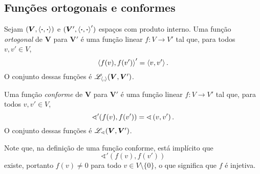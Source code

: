 \subsection{Funções ortogonais e conformes}

\begin{definition}
Sejam $(\bm V,\left\langle{\bm{\cdot}},{\bm{\cdot}}\right\rangle)$ e $(\bm V',\left\langle{\bm{\cdot}},{\bm{\cdot}}\right\rangle')$ espaços com produto interno. Uma função \emph{ortogonal} de $\bm V$ para $\bm V'$ é uma função linear $f\colon V \to V'$ tal que, para todos $v,v' \in V$,
	\begin{equation*}
	\left\langle{f(v)},{f(v')}\right\rangle' = \left\langle{v},{v'}\right\rangle.
	\end{equation*}
O conjunto dessas funções é $\mathscr{L}_{\left\langle{},{}\right\rangle}(\bm V,\bm V')$.

Uma função \emph{conforme} de $\bm V$ para $\bm V'$ é uma função linear $f\colon V \to V'$ tal que, para todos $v,v' \in V$,
	\begin{equation*}
	\sphericalangle'(f(v),f(v')) = \sphericalangle\left({v},{v'}\right).
	\end{equation*}
O conjunto dessas funções é $\mathscr{L}_{\sphericalangle}(\bm V,\bm V')$.
\end{definition}

Note que, na definição de uma função conforme, está implícito que
	\begin{equation*}
	\sphericalangle'(f(v),f(v'))
	\end{equation*}
existe, portanto $f(v) \neq 0$ para todo $v \in V \setminus \{0\}$, o que significa que $f$ é injetiva.

